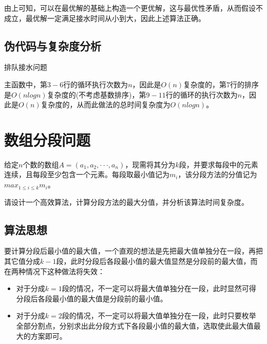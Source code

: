 \documentclass{article}
\begin{document}
由上可知，可以在最优解的基础上构造一个更优解，这与最优性矛盾，从而假设不成立，最优解一定满足接水时间从小到大，因此上述算法正确。

\subsection{伪代码与复杂度分析}

\begin{algorithm}[H]

\caption{排队接水问题}
\LinesNumbered
{}


\end{algorithm}

主函数中，第$3-6$行的循环执行次数为$n$，因此是$O(n)$复杂度的，第$7$行的排序是$O(n log n)$复杂度的(不考虑基数排序)，第$9-11$行的循环的执行次数为$n$，因此是$O(n)$复杂度的，从而此做法的总时间复杂度为$O(n log n)$。

\section{数组分段问题}

给定$n$个数的数组$A=(a_1,a_2,···,a_n)$，现需将其分为$k$段，并要求每段中的元素连续，且每段至少包含一个元素。每段取最小值记为$m_i$，该分段方法的分值记为$max_{1\le{i}\le{k}}m_i$。

请设计一个高效算法，计算分段方法的最大分值，并分析该算法时间复杂度。

\subsection{算法思想}

要计算分段后最小值的最大值，一个直观的想法是先把最大值单独分在一段，再把其它值分成$k-1$段，此时分段后各段最小值的最大值显然是分段前的最大值，而在两种情况下这种做法将失效：

\begin{itemize}[itemindent=3em]
    \item 对于分成$k=1$段的情况，不一定可以将最大值单独分在一段，此时显然可得分段后各段最小值的最大值是分段前的最小值。
    \item 对于分成$k=2$段的情况，不一定可以将最大值单独分在一段，此时只要枚举全部分割点，分别求出此分段方式下各段最小值的最大值，选取使此最大值最大的方案即可。
\end{itemize}
\end{document}
